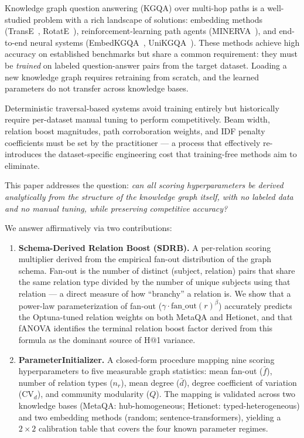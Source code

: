 \documentclass[11pt,a4paper]{article}
\begin{document}
Knowledge graph question answering (KGQA) over multi-hop paths is a well-studied
problem with a rich landscape of solutions: embedding methods
(TransE~\cite{bordes2013translating}, RotatE~\cite{sun2019rotate}),
reinforcement-learning path agents (MINERVA~\cite{das2018go}),
and end-to-end neural systems
(EmbedKGQA~\cite{saxena2020improving}, UniKGQA~\cite{jiang2023unikgqa}).
These methods achieve high accuracy on established benchmarks but share a
common requirement: they must be \emph{trained} on labeled question-answer
pairs from the target dataset.
Loading a new knowledge graph requires retraining from scratch, and the
learned parameters do not transfer across knowledge bases.

Deterministic traversal-based systems avoid training entirely but historically
require per-dataset manual tuning to perform competitively.
Beam width, relation boost magnitudes, path corroboration weights, and IDF
penalty coefficients must be set by the practitioner — a process that effectively
re-introduces the dataset-specific engineering cost that training-free methods
aim to eliminate.

This paper addresses the question: \textit{can all scoring hyperparameters be
derived analytically from the structure of the knowledge graph itself,
with no labeled data and no manual tuning, while preserving competitive accuracy?}

We answer affirmatively via two contributions:

\begin{enumerate}
  \item \textbf{Schema-Derived Relation Boost (SDRB).}
    A per-relation scoring multiplier derived from the empirical fan-out
    distribution of the graph schema.
    Fan-out is the number of distinct (subject, relation) pairs that share the
    same relation type divided by the number of unique subjects using that
    relation --- a direct measure of how ``branchy'' a relation is.
    We show that a power-law parameterization of fan-out
    ($\gamma \cdot \text{fan\_out}(r)^{\beta}$) accurately predicts
    the Optuna-tuned relation weights on both MetaQA and Hetionet, and that
    fANOVA identifies the terminal relation boost factor derived from this
    formula as the dominant source of H@1 variance.

  \item \textbf{ParameterInitializer.}
    A closed-form procedure mapping nine scoring hyperparameters to
    five measurable graph statistics: mean fan-out ($\bar{f}$),
    number of relation types ($n_r$), mean degree ($\bar{d}$),
    degree coefficient of variation ($\text{CV}_d$), and community
    modularity ($Q$).
    The mapping is validated across two knowledge bases
    (MetaQA: hub-homogeneous; Hetionet: typed-heterogeneous)
    and two embedding methods (random; sentence-transformers),
    yielding a $2 \times 2$ calibration table that covers the four
    known parameter regimes.
\end{enumerate}
\end{document}
